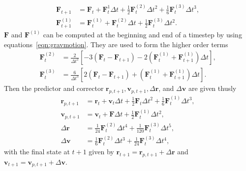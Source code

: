 \documentclass[preprint1]{aastex}
\numberwithin{equation}{section}
\begin{document}
\begin{subequations}
\begin{align}
    \mathbf{F}_{t+1} &= \mathbf{F}_{t} + \mathbf{F}^{1}_{t}\Delta t + \frac{1}{2}\mathbf{F}^{(2)}_{t}\Delta t^2 + \frac{1}{6}\mathbf{F}^{(3)}_{t}\Delta t^3, \\
    \mathbf{F}^{(1)}_{t+1} &= \mathbf{F}^{(1)}_{t} + \mathbf{F}^{(2)}_{t}\Delta t + \frac{1}{2}\mathbf{F}^{(3)}_{t} \Delta t^2.
\end{align}
\label{eqn:LowOrderHermite}
\end{subequations}
$\mathbf{F}$ and $\mathbf{F}^{(1)}$ can be computed at the beginning and end of a timestep by using equations~\ref{eqn:gravmotion}. They are used to form the higher order terms
\begin{subequations}
\begin{align}
    \mathbf{F}^{(2)}_{t} &= \frac{2}{\Delta t^2}\left[-3(\mathbf{F}_{t} -\mathbf{F}_{t+1}) - 2(\mathbf{F}^{(1)}_{t} + \mathbf{F}^{(1)}_{t+1}) \Delta t\right], \\
    \mathbf{F}^{(3)}_{t} &= \frac{6}{\Delta t^3}\left[2(\mathbf{F}_{t} - \mathbf{F}_{t+1}) + (\mathbf{F}^{(1)}_{t} + \mathbf{F}^{(1)}_{t+1})\Delta t\right].
\end{align}
\label{eqn:HigherOrderHermite}
\end{subequations}
Then the predictor and corrector $\mathbf{r}_{p, t+1}, \mathbf{v}_{p, t+1}, \Delta \mathbf{r}$, and $\Delta \mathbf{v}$ are given thusly
\begin{subequations}
\begin{align}
    \mathbf{r}_{p, t+1} &= \mathbf{r}_{t} + \mathbf{v}_{t} \Delta t + \frac{1}{2} \mathbf{F}_{t} \Delta t^2 + \frac{1}{6} \mathbf{F}^{(1)}_{t} \Delta t^3, \\
    \mathbf{v}_{p, t+1} &= \mathbf{v}_{t} + \mathbf{F} \Delta t + \frac{1}{2}\mathbf{F}^{(1)}_{t} \Delta t^2, \\
    \Delta \mathbf{r} &= \frac{1}{24} \mathbf{F}^{(2)}_{t} \Delta t^4 + \frac{1}{120}\mathbf{F}^{(3)}_{t} \Delta t^5, \\
    \Delta \mathbf{v} &= \frac{1}{6} \mathbf{F}^{(2)}_{t} \Delta t^3 + \frac{1}{24}\mathbf{F}^{(3)}_{t} \Delta t^4,
    \end{align}
\label{eqn:PredCorr}
\end{subequations}
with the final state at $t+1$ given by $\mathbf{r}_{t+1} = \mathbf{r}_{p, t+1} + \Delta \mathbf{r}$ and $ \mathbf{v}_{t+1} = \mathbf{v}_{p, t+1} + \Delta \mathbf{v}$. 
\end{document}
